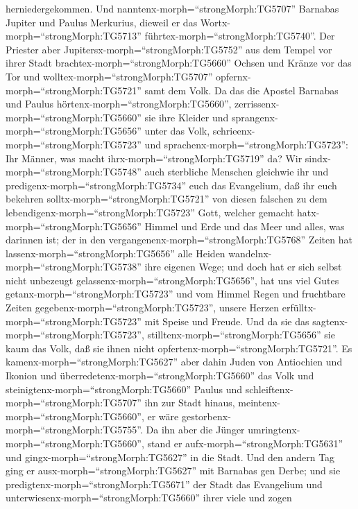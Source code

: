 herniedergekommen.  Und
nanntenx-morph=``strongMorph:TG5707'' Barnabas Jupiter und Paulus
Merkurius, dieweil er das Wortx-morph=``strongMorph:TG5713''
führtex-morph=``strongMorph:TG5740''.  Der Priester aber
Jupitersx-morph=``strongMorph:TG5752'' aus dem Tempel vor ihrer Stadt
brachtex-morph=``strongMorph:TG5660'' Ochsen und Kränze vor das Tor und
wolltex-morph=``strongMorph:TG5707''
opfernx-morph=``strongMorph:TG5721'' samt dem Volk.  Da das
die Apostel Barnabas und Paulus hörtenx-morph=``strongMorph:TG5660'',
zerrissenx-morph=``strongMorph:TG5660'' sie ihre Kleider und
sprangenx-morph=``strongMorph:TG5656'' unter das Volk,
schrieenx-morph=``strongMorph:TG5723''  und
sprachenx-morph=``strongMorph:TG5723'': Ihr Männer, was macht
ihrx-morph=``strongMorph:TG5719'' da? Wir
sindx-morph=``strongMorph:TG5748'' auch sterbliche Menschen gleichwie
ihr und predigenx-morph=``strongMorph:TG5734'' euch das Evangelium, daß
ihr euch bekehren solltx-morph=``strongMorph:TG5721'' von diesen
falschen zu dem lebendigenx-morph=``strongMorph:TG5723'' Gott, welcher
gemacht hatx-morph=``strongMorph:TG5656'' Himmel und Erde und das Meer
und alles, was darinnen ist;  der in den
vergangenenx-morph=``strongMorph:TG5768'' Zeiten hat
lassenx-morph=``strongMorph:TG5656'' alle Heiden
wandelnx-morph=``strongMorph:TG5738'' ihre eigenen Wege; 
und doch hat er sich selbst nicht unbezeugt
gelassenx-morph=``strongMorph:TG5656'', hat uns viel Gutes
getanx-morph=``strongMorph:TG5723'' und vom Himmel Regen und fruchtbare
Zeiten gegebenx-morph=``strongMorph:TG5723'', unsere Herzen
erfülltx-morph=``strongMorph:TG5723'' mit Speise und Freude.
 Und da sie das sagtenx-morph=``strongMorph:TG5723'',
stilltenx-morph=``strongMorph:TG5656'' sie kaum das Volk, daß sie ihnen
nicht opfertenx-morph=``strongMorph:TG5721''.  Es
kamenx-morph=``strongMorph:TG5627'' aber dahin Juden von Antiochien und
Ikonion und überredetenx-morph=``strongMorph:TG5660'' das Volk und
steinigtenx-morph=``strongMorph:TG5660'' Paulus und
schleiftenx-morph=``strongMorph:TG5707'' ihn zur Stadt hinaus,
meintenx-morph=``strongMorph:TG5660'', er wäre
gestorbenx-morph=``strongMorph:TG5755''.  Da ihn aber die
Jünger umringtenx-morph=``strongMorph:TG5660'', stand er
aufx-morph=``strongMorph:TG5631'' und gingx-morph=``strongMorph:TG5627''
in die Stadt. Und den andern Tag ging er
ausx-morph=``strongMorph:TG5627'' mit Barnabas gen Derbe; 
und sie predigtenx-morph=``strongMorph:TG5671'' der Stadt das Evangelium
und unterwiesenx-morph=``strongMorph:TG5660'' ihrer viele und zogen
